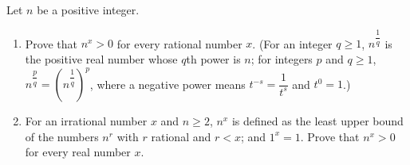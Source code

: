 Let $n$ be a positive integer.
\begin{enumerate}
\item[(a)] Prove that $n^x>0$ for every rational number $x$. (For an integer $q\ge1$, $n^{\dfrac1q}$ is the positive real number whose $q$th power is $n$; for integers $p$ and $q\ge1$, $n^{\dfrac pq}=\left(n^{\dfrac1q}\right)^p$, where a negative power means $t^{-s}=\dfrac1{t^s}$ and $t^0=1$.)
\item[(b)] For an irrational number $x$ and $n\ge2$, $n^x$ is defined as the least upper bound of the numbers $n^r$ with $r$ rational and $r<x$; and $1^x=1$. Prove that $n^x>0$ for every real number $x$.
\end{enumerate}
